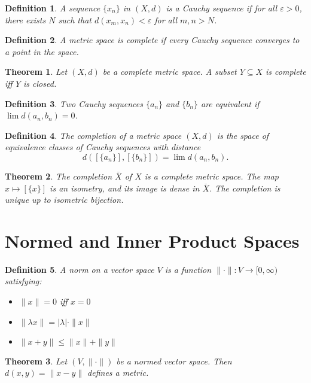 \documentclass{article}
\newtheorem{theorem}{Theorem}
\newtheorem{definition}{Definition}
\begin{document}
\begin{definition}
A sequence $\{x_n\}$ in $(X, d)$ is a \emph{Cauchy sequence} if for all $\varepsilon > 0$, there exists $N$ such that $d(x_m, x_n) < \varepsilon$ for all $m, n > N$.
\end{definition}

\begin{definition}
A metric space is \emph{complete} if every Cauchy sequence converges to a point in the space.
\end{definition}

\begin{theorem}
Let $(X, d)$ be a complete metric space. A subset $Y \subseteq X$ is complete iff $Y$ is closed.
\end{theorem}

\begin{definition}
Two Cauchy sequences $\{a_n\}$ and $\{b_n\}$ are equivalent if $\lim d(a_n, b_n) = 0$.
\end{definition}

\begin{definition}
The \emph{completion} of a metric space $(X, d)$ is the space of equivalence classes of Cauchy sequences with distance
\[
d([\{a_n\}], [\{b_n\}]) = \lim d(a_n, b_n).
\]
\end{definition}

\begin{theorem}
The completion $\overline{X}$ of $X$ is a complete metric space. The map $x \mapsto [\{x\}]$ is an isometry, and its image is dense in $\overline{X}$. The completion is unique up to isometric bijection.
\end{theorem}

\section*{Normed and Inner Product Spaces}

\begin{definition}
A \emph{norm} on a vector space $V$ is a function $\|\cdot\|: V \to [0, \infty)$ satisfying:
\begin{itemize}
  \item $\|x\| = 0$ iff $x = 0$
  \item $\|\lambda x\| = |\lambda| \cdot \|x\|$
  \item $\|x + y\| \leq \|x\| + \|y\|$
\end{itemize}
\end{definition}

\begin{theorem}
Let $(V, \|\cdot\|)$ be a normed vector space. Then $d(x, y) = \|x - y\|$ defines a metric.
\end{theorem}
\end{document}

